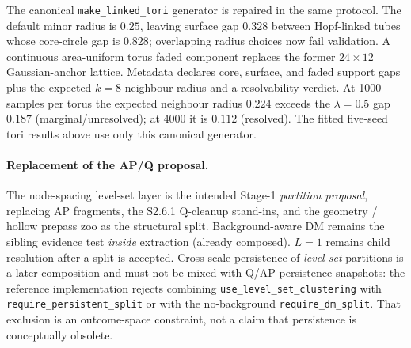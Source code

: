 \documentclass[11pt]{article}
\begin{document}
The canonical \texttt{make\_linked\_tori} generator is repaired in the
same protocol. The default minor radius is $0.25$, leaving surface gap
$0.328$ between Hopf-linked tubes whose core-circle gap is $0.828$;
overlapping radius choices now fail validation. A continuous
area-uniform torus faded component replaces the former $24\times12$
Gaussian-anchor lattice. Metadata declares core, surface, and faded
support gaps plus the expected $k{=}8$ neighbour radius and a
resolvability verdict. At 1000 samples per torus the expected neighbour
radius $0.224$ exceeds the $\lambda{=}0.5$ gap $0.187$
(marginal/unresolved); at
4000 it is $0.112$ (resolved). The fitted five-seed tori results above
use only this canonical generator.

\paragraph{Replacement of the AP/Q proposal.}
The node-spacing level-set layer is the intended Stage-1 \emph{partition
proposal}, replacing AP fragments, the S2.6.1 Q-cleanup stand-ins, and the
geometry / hollow prepass zoo as the structural split. Background-aware DM
remains the sibling evidence test \emph{inside} extraction (already composed).
$L{=}1$ remains child resolution after a split is accepted. Cross-scale
persistence of \emph{level-set} partitions is a later composition and must
not be mixed with Q/AP persistence snapshots: the reference implementation
rejects combining \texttt{use\_level\_set\_clustering} with
\texttt{require\_persistent\_split} or with the no-background
\texttt{require\_dm\_split}. That exclusion is an outcome-space constraint,
not a claim that persistence is conceptually obsolete.
\end{document}
